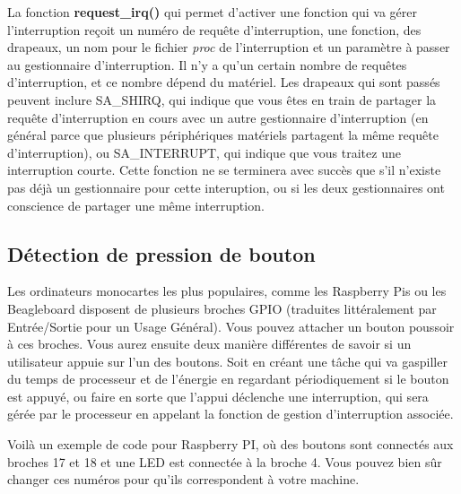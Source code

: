 \documentclass[11pt]{article}
\begin{document}
La fonction \textbf{request\_irq()} qui permet d'activer une fonction qui va gérer l'interruption reçoit un numéro de requête d'interruption, une fonction, des drapeaux, un nom pour le fichier \emph{proc} de l'interruption et un paramètre à passer au gestionnaire d'interruption. Il n'y a qu'un certain nombre de requêtes d'interruption, et ce nombre dépend du matériel. Les drapeaux qui sont passés peuvent inclure SA\_SHIRQ, qui indique que vous êtes en train de partager la requête d'interruption en cours avec un autre gestionnaire d'interruption (en général parce que plusieurs périphériques matériels partagent la même requête d'interruption), ou SA\_INTERRUPT, qui indique que vous traitez une interruption courte. Cette fonction ne se terminera avec succès que s'il n'existe pas déjà un gestionnaire pour cette interuption, ou si les deux gestionnaires ont conscience de partager une même interruption.

\subsection*{Détection de pression de bouton}
\label{sec-15-2}

Les ordinateurs monocartes les plus populaires, comme les Raspberry Pis ou les Beagleboard disposent de plusieurs broches GPIO (traduites littéralement par Entrée/Sortie pour un Usage Général). Vous pouvez attacher un bouton poussoir à ces broches. Vous aurez ensuite deux manière différentes de savoir si un utilisateur appuie sur l'un des boutons. Soit en créant une tâche qui va gaspiller du temps de processeur et de l'énergie en regardant périodiquement si le bouton est appuyé, ou faire en sorte que l'appui déclenche une interruption, qui sera gérée par le processeur en appelant la fonction de gestion d'interruption associée.

Voilà un exemple de code pour Raspberry PI, où des boutons sont connectés aux broches 17 et 18 et une LED est connectée à la broche 4. Vous pouvez bien sûr changer ces numéros pour qu'ils correspondent à votre machine.
\end{document}
